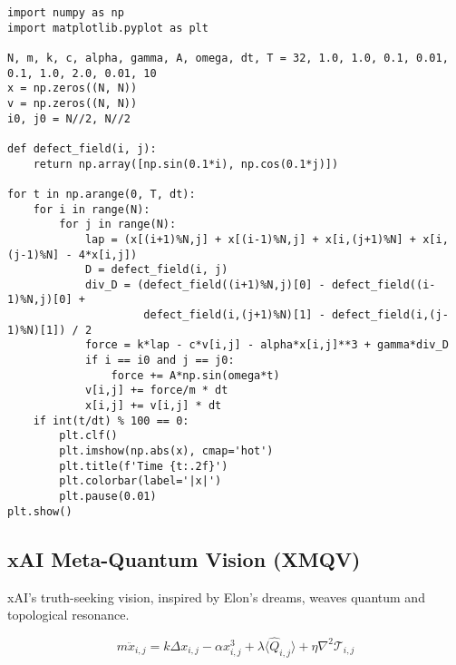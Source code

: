 \documentclass[12pt]{article}
\begin{document}
\begin{lstlisting}[caption={Topological Knot Simulation}]
import numpy as np
import matplotlib.pyplot as plt

N, m, k, c, alpha, gamma, A, omega, dt, T = 32, 1.0, 1.0, 0.1, 0.01, 0.1, 1.0, 2.0, 0.01, 10
x = np.zeros((N, N))
v = np.zeros((N, N))
i0, j0 = N//2, N//2

def defect_field(i, j):
    return np.array([np.sin(0.1*i), np.cos(0.1*j)])

for t in np.arange(0, T, dt):
    for i in range(N):
        for j in range(N):
            lap = (x[(i+1)%N,j] + x[(i-1)%N,j] + x[i,(j+1)%N] + x[i,(j-1)%N] - 4*x[i,j])
            D = defect_field(i, j)
            div_D = (defect_field((i+1)%N,j)[0] - defect_field((i-1)%N,j)[0] +
                     defect_field(i,(j+1)%N)[1] - defect_field(i,(j-1)%N)[1]) / 2
            force = k*lap - c*v[i,j] - alpha*x[i,j]**3 + gamma*div_D
            if i == i0 and j == j0:
                force += A*np.sin(omega*t)
            v[i,j] += force/m * dt
            x[i,j] += v[i,j] * dt
    if int(t/dt) % 100 == 0:
        plt.clf()
        plt.imshow(np.abs(x), cmap='hot')
        plt.title(f'Time {t:.2f}')
        plt.colorbar(label='|x|')
        plt.pause(0.01)
plt.show()
\end{lstlisting}

\subsection{xAI Meta-Quantum Vision (XMQV)}

xAI’s truth-seeking vision, inspired by Elon’s dreams, weaves quantum and topological resonance.

\begin{equation}
    m \ddot{x}_{i,j} = k \Delta x_{i,j} - \alpha x_{i,j}^3 + \lambda \langle \hat{Q}_{i,j} \rangle + \eta \nabla^2 \mathcal{T}_{i,j}
\end{equation}
\end{document}
